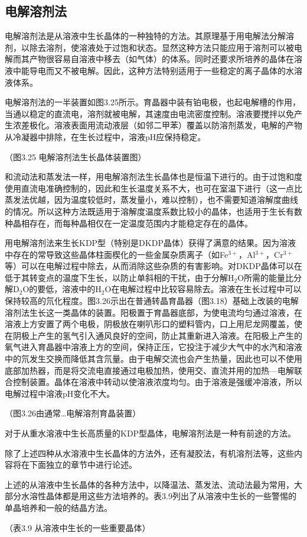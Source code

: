 ﻿\subsection{电解溶剂法}
电解溶剂法是从溶液中生长晶体的一种独特的方法。其原理基于用电解法分解溶剂，以除去溶剂，使溶液处于过饱和状态。显然这种方法只能应用于溶剂可以被电解而其产物很容易自溶液中移去（如气体）的体系。同时还要求所培养的晶体在溶液中能导电而又不被电解。因此，这种方法特别适用于一些稳定的离子晶体的水溶液体系。

电解溶剂法的一半装置如图3.25所示。育晶器中装有铂电极，也起电解槽的作用，当通以稳定的直流电，溶剂就被电解，其速度由电流密度控制。溶液要搅拌以免产生浓差极化。溶液表面用流动液层（如邻二甲苯）覆盖以防溶剂蒸发，电解的产物从冷凝器中排除，在生长过程中，溶液pH应保持稳定。

（图3.25 电解溶剂法生长晶体装置图）

和流动法和蒸发法一样，用电解溶剂法生长晶体也是恒温下进行的。由于过饱和度使用直流电准确控制的，因此和生长温度关系不大，也可在室温下进行（这一点比蒸发法优越，因为温度较低时，蒸发量小，难以控制），也不需要知道溶解度曲线的情况。所以这种方法既适用于溶解度温度系数比较小的晶体，也适用于生长有数种晶相存在，而每种晶相仅在一定温度范围内才能稳定存在的晶体。

用电解溶剂法来生长KDP型（特别是DKDP晶体）获得了满意的结果。因为溶液中存在的常导致这些晶体柱面楔化的一些金属杂质离子（如Fe$^{3+}$，Al$^{3+}$，Cr$^{3+}$等）可以在电解过程中除去，从而消除这些杂质的有害影响。对DKDP晶体可以在低于其转变点的温度下生长，以防止单斜相的干扰，由于分解H$_2$O所需的能量比分解D$_2$O的要低，溶液中的H$_2$O在电解过程中比较容易除去。溶液在生长过程中可以保持较高的氘化程度。图3.26示出在普通转晶育晶器（图3.18）基础上改装的电解溶剂法生长这一类晶体的装置。阳极置于育晶器底部，为使电流均匀通过溶液，在溶液上方安置了两个电极，阴极放在喇叭形口的塑料管内，口上用尼龙网覆盖，使在阴极上产生的氢气引入通风良好的空间，防止其重新进入溶液。在阳极上产生的氧气进入育晶器中溶液上方的空间，保持正压，它投注于减少大气中的水汽和溶液中的氘发生交换而降低其含氘量。由于电解交流也会产生热量，因此也可以不使用底部加热器，而是将交流电直接通过电极加热，使用交、直流并用的加热—电解联合控制装置。晶体在溶液中转动以使溶液浓度均匀。由于溶液是强缓冲溶液，所以电解过程中溶液pH变化不大。

（图3.26由通常…电解溶剂育晶装置）

对于从重水溶液中生长高质量的KDP型晶体，电解溶剂法是一种有前途的方法。

除了上述四种从水溶液中生长晶体的方法外，还有凝胶法，有机溶剂法等，这些内容将在下面独立的章节中进行论述。

上述的从溶液中生长晶体的各种方法中，以降温法、蒸发法、流动法最为常用，大部分水溶性晶体都是用这些方法培养的。表3.9列出了从溶液中生长的一些警惕的单晶培养和一般的结晶方法。

（表3.9  从溶液中生长的一些重要晶体）

